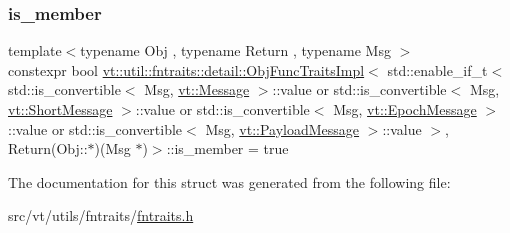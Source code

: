 \subsubsection{\texorpdfstring{is\+\_\+member}{is\_member}}
{\footnotesize\ttfamily template$<$typename Obj , typename Return , typename Msg $>$ \\
constexpr bool \hyperlink{structvt_1_1util_1_1fntraits_1_1detail_1_1_obj_func_traits_impl}{vt\+::util\+::fntraits\+::detail\+::\+Obj\+Func\+Traits\+Impl}$<$ std\+::enable\+\_\+if\+\_\+t$<$ std\+::is\+\_\+convertible$<$ Msg, \hyperlink{namespacevt_a3a3ddfef40b4c90915fa43cdd5f129ea}{vt\+::\+Message} $>$\+::value or std\+::is\+\_\+convertible$<$ Msg, \hyperlink{namespacevt_a1125ac1da6c0bbf141e0ea0739d7602d}{vt\+::\+Short\+Message} $>$\+::value or std\+::is\+\_\+convertible$<$ Msg, \hyperlink{namespacevt_ad67368ffae52d7325002586b41bb150e}{vt\+::\+Epoch\+Message} $>$\+::value or std\+::is\+\_\+convertible$<$ Msg, \hyperlink{namespacevt_a89a92229c5622b855c02c549f83a1a68}{vt\+::\+Payload\+Message} $>$\+::value $>$, Return(Obj\+::$\ast$)(Msg $\ast$)$>$\+::is\+\_\+member = true\hspace{0.3cm}{\ttfamily [static]}}



The documentation for this struct was generated from the following file\+:\begin{DoxyCompactItemize}
\item 
src/vt/utils/fntraits/\hyperlink{fntraits_8h}{fntraits.\+h}\end{DoxyCompactItemize}
